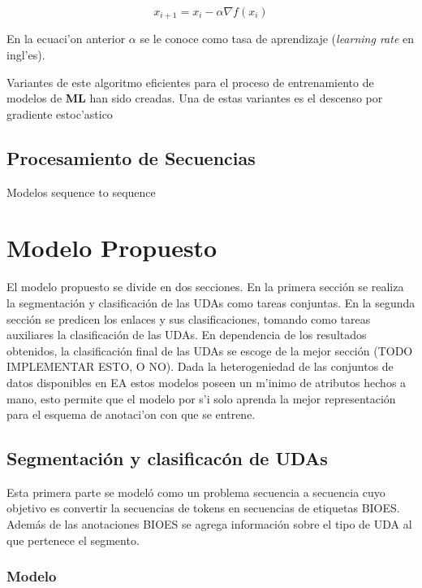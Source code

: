 \begin{equation}
	x_{i+1} = x_i - \alpha \nabla f(x_i)
\end{equation}\label{eq:gradien_descent}

En la ecuaci'on anterior $\alpha$ se le conoce como tasa de aprendizaje (\emph{learning rate} en ingl'es).

Variantes de este algoritmo eficientes para el proceso de entrenamiento de modelos de \textbf{ML} han sido 
creadas. Una de estas variantes es el descenso por gradiente estoc'astico

\subsection{Procesamiento de Secuencias}

Modelos sequence to sequence


\section{Modelo Propuesto}

El modelo propuesto se divide en dos secciones. En la primera sección se realiza la segmentación y clasificación de 
las UDAs como tareas conjuntas. En la segunda sección se predicen los enlaces y sus clasificaciones, tomando
como tareas auxiliares la clasificación de las UDAs. En dependencia de los resultados obtenidos, la clasificación final de 
las UDAs se escoge de la mejor sección (TODO IMPLEMENTAR ESTO, O NO). 
Dada la heterogeniedad de las conjuntos de datos disponibles en EA estos modelos poseen un m'inimo de 
atributos hechos a mano, esto permite que el modelo por s'i solo aprenda la mejor representación para el
esquema de anotaci'on con que se entrene. 

\subsection{Segmentación y clasificacón de UDAs}

Esta primera parte se modeló como un problema secuencia a secuencia cuyo objetivo es convertir la secuencias de 
tokens en secuencias de etiquetas BIOES. Además de las anotaciones BIOES se agrega información sobre el 
tipo de UDA al que pertenece el segmento.

\subsubsection{Modelo}


